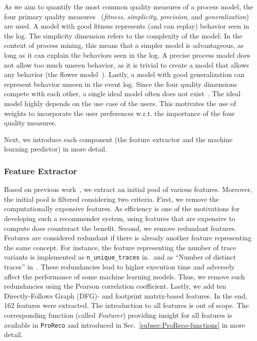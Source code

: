 As we aim to quantify the most common quality measures of a process model, the four primary quality measures~\cite{Aalst16PMbook} (\emph{fitness}, \emph{simplicity}, \emph{precision}, and \emph{generalization}) are used. 
A model with good fitness represents (and can replay) behavior seen in the log. 
The simplicity dimension refers to the complexity of the model. 
In the context of process mining, this means that a simpler model is advantageous, as long as it can explain the behaviors seen in the log. 
A precise process model does not allow too much unseen behavior, as it is trivial to create a model that allows any behavior (the flower model~\cite{Aalst16PMbook}). 
Lastly, a model with good generalization can represent behavior unseen in the event log. 
Since the four quality dimensions compete with each other, a single ideal model often does not exist~\cite{Aalst16PMbook}. 
The ideal model highly depends on the use case of the users. 
This motivates the use of weights to incorporate the user preferences w.r.t. the importance of the four quality measures. 

Next, we introduce each component (the feature extractor and the machine learning predictor) in more detail. 

\subsubsection{Feature Extractor}
Based on previous work~\cite{RibeiroCMS14Recommend,TavaresJD22MetaRecommend,Zandkarimi2021Fig4PM}, we extract an initial pool of various features. 
Moreover, the initial pool is filtered considering two criteria. 
First, we remove the computationally expensive features. 
As efficiency is one of the motivations for developing such a recommender system, using features that are expensive to compute does counteract the benefit. 
Second, we remove redundant features. 
Features are considered redundant if there is already another feature representing the same concept. 
For instance, the feature representing the number of trace variants is implemented as \texttt{n\_unique\_traces} in~\cite{TavaresJD22MetaRecommend} and as “Number of distinct traces” in~\cite{RibeiroCMS14Recommend}. 
These redundancies lead to higher execution time and adversely affect the performance of some machine learning models. 
Thus, we remove such redundancies using the Pearson correlation coefficient. 
Lastly, we add ten Directly-Follows Graph (DFG)- and footprint matrix-based features. 
In the end, 162 features were extracted. 
The introduction to all features is out of scope. 
The corresponding function (called \textit{Featurer}) providing insight for all features is available in \texttt{ProReco} and introduced in Sec.~\ref{subsec:ProReco-functions} in more detail. 

